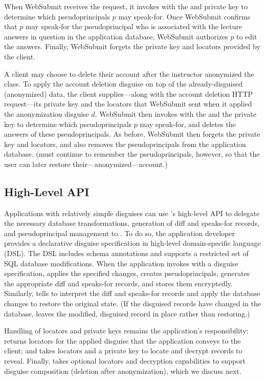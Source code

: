 When WebSubmit receives the request, it invokes  with the
 and private key to determine which pseudoprincipals $p$ may speak-for.
%
Once WebSubmit confirms that $p$ may speak-for the pseudoprincipal who is
associated with the lecture answers in question in the application database,
WebSubmit authorizes $p$ to edit the answers.
%
Finally, WebSubmit forgets the private key and locators provided by the client.
%

%
A client may choose to delete their account after the instructor anonymized the
class.
%
To apply the account deletion disguise on top of the already-disguised (anonymized)
data, the client supplies---along with the account deletion HTTP request---its
private key and the locators  that WebSubmit sent when it applied the
anonymization disguise $d$.
%
WebSubmit then invokes  with the  and the private
key to determine which pseudoprincipals $p$ may speak-for, and deletes the answers
of these pseudoprincipals.
%
As before, WebSubmit then forgets the private key and locators, and also removes
the pseudoprincipals from the application database.
%
(\sys must continue to remember the pseudoprincipals, however, so that the user
can later restore their---anonymized---account.)
%

\subsection{High-Level API}
\label{s:api-high}

%
Applications with relatively simple disguises can use \sys's high-level API to
delegate the necessary database transformations, generation of diff and speaks-for
records, and pseudoprincipal management to \sys.
%
To do so, the application developer provides a declarative disguise specification in
\sys high-level domain-specific language (DSL).
%
The DSL includes schema annotations and supports a restricted set of SQL database
modifications.
%
When the application invokes  with a disguise specification, \sys
applies the specified changes, creates pseudoprincipals, generates the appropriate
diff and speaks-for records, and stores them encryptedly.
%
Similarly,  tells \sys to interpret the diff and speaks-for
records and apply the database changes to restore the original state.
%
(If the disguised records have changed in the database, \sys leaves the modified,
disguised record in place rather than restoring.)
%

%
Handling of locators and private keys remains the application's responsibility:
 returns locators for the applied disguise that the
application conveys to the client; and  takes locators and a
private key to locate and decrypt records to reveal.
%
Finally,  takes optional locators and decryption capabilities
to support disguise composition (\eg deletion after anonymization), which
we discuss next.
%
